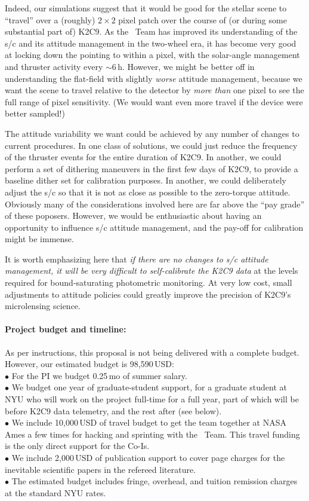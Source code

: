 \documentclass[12pt,preprint]{aastex}
\begin{document}
Indeed, our simulations suggest that it would be good for the stellar
scene to ``travel'' over a (roughly) $2\times2$ pixel patch over the
course of (or during some substantial part of) K2C9.
As the \ktwo\ Team has improved its understanding of the s/c and its
attitude management in the two-wheel era, it has become very good at
locking down the pointing to within a pixel, with the solar-angle
management and thruster activity every $\sim 6$\,h.
However, we might be better off in understanding the flat-field with
slightly \emph{worse} attitude management, because we want the scene
to travel relative to the detector by \emph{more than} one pixel to
see the full range of pixel sensitivity.
(We would want even more travel if the device were better sampled!)

The attitude variability we want could be achieved by any number of
changes to current procedures.
In one class of solutions, we could just reduce the frequency of the
thruster events for the entire duration of K2C9.
In another, we could perform a set of dithering maneuvers in the first
few days of K2C9, to provide a baseline dither set for calibration
purposes.
In another, we could deliberately adjust the s/c so that it is not as
close as possible to the zero-torque attitude.
Obviously many of the considerations involved here are far above the
``pay grade'' of these poposers.
However, we would be enthusiastic about having an opportunity to influence
s/c attitude management, and the pay-off for calibration might be immense.

It is worth emphasizing here that \emph{if there are no changes to s/c
  attitude management, it will be very difficult to self-calibrate the
  K2C9 data} at the levels required for bound-saturating photometric monitoring.
At very low cost, small adjustments to attitude policies could greatly
improve the precision of K2C9's microlensing science.

\paragraph{Project budget and timeline:}

As per instructions, this proposal is not being delivered with a complete
budget.
However, our estimated budget is 98,590\,USD:\\
$\bullet$ For the PI we budget 0.25\,mo of summer salary.\\
$\bullet$ We budget one year of graduate-student support, for a
graduate student at NYU who will work on the project full-time for a full
year, part of which will be before K2C9 data telemetry, and the rest
after (see below).\\
$\bullet$ We include 10,000\,USD of travel budget to get the team
together at NASA Ames a few times for hacking and sprinting with the
\ktwo\ Team.  This travel funding is the only direct support for the
Co-Is.\\
$\bullet$ We include 2,000\,USD of publication support to cover page
charges for the inevitable scientific papers in the refereed
literature.\\
$\bullet$ The estimated budget includes fringe, overhead, and tuition
remission charges at the standard NYU rates.
\end{document}
